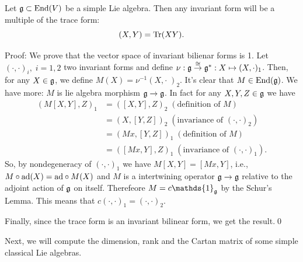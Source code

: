 \begin{dang}
    \begin{lemma}
        Let $\mathfrak{g}\subset\text{End}(V)$ be a simple Lie algebra. 
        Then any invariant form will be a multiple of the trace form:
        \begin{equation}
            (X,Y)=\text{Tr}(XY).
        \end{equation}
    \end{lemma}
\end{dang}
Proof: We prove that the vector space of invariant bilienar forms is 1. Let $(\cdot,\cdot)_i,\;i=1,2$ two invariant forms and 
define $\nu:\mathfrak{g}\overset{\cong}{\to}\mathfrak{g}^*:X\mapsto (X,\cdot)_1$. Then, for any $X\in \mathfrak{g}$, we define $M(X)=\nu^{-1}(X,\cdot\;)_2$. It's clear 
that $M\in\text{End}(\mathfrak{g})$. We have more: $M$ is lie algebra morphism $\mathfrak{g}\to \mathfrak{g}$. In fact for any $X,Y,Z\in\mathfrak{g}$ we have
\begin{equation}
    \begin{split}
        (M[X,Y],Z)_1&=([X,Y],Z)_2\;(\text{definition of }M)\\
        &=(X,[Y,Z])_2\;(\text{invariance of }(\cdot,\cdot)_2)\\
        &=(Mx,[Y,Z])_1\;(\text{definition of }M)\\
        &=([Mx,Y],Z)_1\;(\text{invariance of }(\cdot,\cdot)_1).
    \end{split}
\end{equation}  
So, by nondegeneracy of $(\cdot,\cdot)_1$ we have $M[X,Y]=[Mx,Y]$, i.e., $M\circ \text{ad}(X)=\text{ad}\circ M(X)$ and $M$ is a intertwining 
operator $\mathfrak{g}\to\mathfrak{g}$ relative to the adjoint action of $\mathfrak{g}$ on itself. Therefeore $M=c\mathds{1}_{\fr{g}}$ by the Schur's Lemma. 
This means that $c(\cdot,\cdot)_1=(\cdot,\cdot)_2$.\par 
Finally, since the trace form is an invariant bilinear form, we get the result.\qed

Next, we will compute the dimension, rank and the Cartan matrix of some simple classical Lie algebras.

